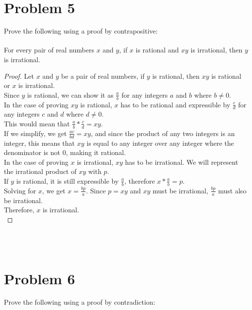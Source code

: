 \documentclass{amsart}
\theoremstyle{definition}
\theoremstyle{Exercise}
\theoremstyle{remark}
\theoremstyle{rule}
\numberwithin{equation}{section}
\begin{document}
 \newpage
\section*{Problem 5}

Prove the following using a proof by contrapositive:
\\\\

For every pair of real numbers $x$ and $y$, if $x$ is rational and $xy$ is irrational, then $y$ is irrational.\\
\begin{proof}
Let $x$ and $y$ be a pair of real numbers, if $y$ is rational, then $xy$ is rational or $x$ is irrational.\\
Since $y$ is rational, we can show it as $\frac{a}{b}$ for any integers $a$ and $b$ where $b \not= 0$.\\
In the case of proving $xy$ is rational, $x$ has to be rational and expressible by $\frac{c}{d}$ for any integers $c$ and $d$ where $d \not= 0$.\\
This would mean that $\frac{a}{b} * \frac{c}{d} = xy$.\\
If we simplify, we get $\frac{ac}{bd} = xy$, and since the product of any two integers is an integer, this means that $xy$ is equal to any integer over any integer where the denominator is not 0, making it rational.\\
In the case of proving $x$ is irrational, $xy$ has to be irrational. We will represent the irrational product of $xy$ with $p$.\\
If $y$ is rational, it is still expressible by $\frac{a}{b}$, therefore $x * \frac{a}{b} = p$.\\
Solving for $x$, we get $x = \frac{bp}{a}$. Since $p = xy$ and $xy$ must be irrational, $\frac{bp}{a}$ must also be irrational.\\
Therefore, $x$ is irrational.\\
\end{proof}


\\\\




 \newpage

\section*{Problem 6}
Prove the following using a proof by contradiction:
\\\\
\end{document}
